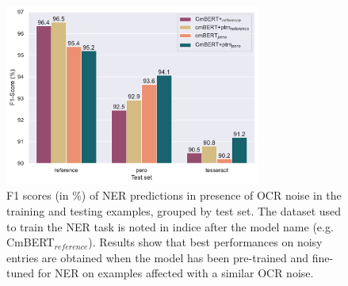 \begin{figure}
    \centering
    \includegraphics[width=0.75\textwidth]{images/experiment_2_f1_with_noise_graph.pdf}
    \caption{\label{fig:exp_2_eval_ner}F1 scores (in \%) of NER predictions in presence of OCR noise in the training and testing examples, grouped by test set. The dataset used to train the NER task is noted in indice after the model name (e.g. CmBERT$_{reference}$).  Results show that best performances on noisy entries are obtained when the model has been pre-trained and fine-tuned for NER on examples affected with a similar OCR noise.}
\end{figure}

